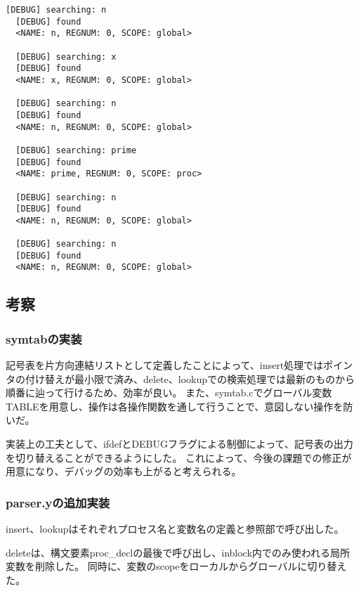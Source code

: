 \begin{lstlisting}[caption={./parser pl0b.pの実行結果},label={./parser pl0b.pの実行結果}]
  [DEBUG] searching: n
  [DEBUG] found
  <NAME: n, REGNUM: 0, SCOPE: global>
  
  [DEBUG] searching: x
  [DEBUG] found
  <NAME: x, REGNUM: 0, SCOPE: global>
  
  [DEBUG] searching: n
  [DEBUG] found
  <NAME: n, REGNUM: 0, SCOPE: global>
  
  [DEBUG] searching: prime
  [DEBUG] found
  <NAME: prime, REGNUM: 0, SCOPE: proc>
  
  [DEBUG] searching: n
  [DEBUG] found
  <NAME: n, REGNUM: 0, SCOPE: global>
  
  [DEBUG] searching: n
  [DEBUG] found
  <NAME: n, REGNUM: 0, SCOPE: global>  
\end{lstlisting}

\subsection{考察}
\subsubsection{symtabの実装}
記号表を片方向連結リストとして定義したことによって、insert処理ではポインタの付け替えが最小限で済み、delete、lookupでの検索処理では最新のものから順番に辿って行けるため、効率が良い。
また、symtab.cでグローバル変数TABLEを用意し、操作は各操作関数を通して行うことで、意図しない操作を防いだ。

実装上の工夫として、ifdefとDEBUGフラグによる制御によって、記号表の出力を切り替えることができるようにした。
これによって、今後の課題での修正が用意になり、デバッグの効率も上がると考えられる。

\subsubsection{parser.yの追加実装}
insert、lookupはそれぞれプロセス名と変数名の定義と参照部で呼び出した。

deleteは、構文要素proc\_declの最後で呼び出し、inblock内でのみ使われる局所変数を削除した。
同時に、変数のscopeをローカルからグローバルに切り替えた。
